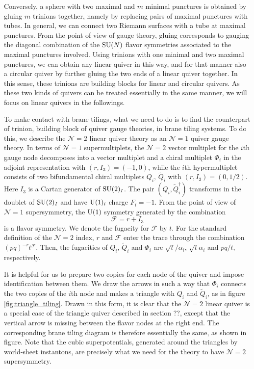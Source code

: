 Conversely, a sphere with two maximal and $m$ minimal punctures is
obtained by gluing $m$ trinions together, namely by replacing pairs
of maximal punctures with tubes. In general, we can connect two Riemann
surfaces with a tube at maximal punctures. From the point of view
of gauge theory, gluing corresponds to gauging the diagonal combination
of the $\mathrm{SU}(N)$ flavor symmetries associated to the maximal punctures
involved. Using trinions with one minimal and two maximal punctures,
we can obtain any linear quiver in this way, and for that manner also
a circular quiver by further gluing the two ends of a linear quiver
together. In this sense, these trinions are building blocks for linear
and circular quivers. As these two kinds of quivers can be treated
essentially in the same manner, we will focus on linear quivers in
the followings.

To make contact with brane tilings, what we need to do is to find
the counterpart of trinion, building block of quiver gauge theories,
in brane tiling systems. To do this, we describe the $\mathcal{N}=2$
linear quiver theory as an $\mathcal{N}=1$ quiver gauge theory. In
terms of $\mathcal{N}=1$ supermultiplets, the $\mathcal{N}=2$ vector
multiplet for the $i$th gauge node decomposes into a vector multiplet
and a chiral multiplet $\Phi_{i}$ in the adjoint representation with
$\left(r,I_{3}\right)=\left(-1,0\right)$, while the $i$th hypermultiplet
consists of two bifundamental chiral multiplets $Q_{i},\,\tilde{Q}_{i}$
with $\left(r,I_{3}\right)=\left(0,1/2\right)$. Here $I_{3}$ is
a Cartan generator of $\mathrm{SU}(2)_{I}$. The pair $(Q_{i},\tilde{Q}_{i}^{\dagger})$
transforms in the doublet of $\mathrm{SU}(2)_{I}$ and have $\mathrm{U}(1)_{i}$ charge
$F_{i}=-1$. From the point of view of $\mathcal{N}=1$ supersymmetry,
the $\mathrm{U}(1)$ symmetry generated by the combination 
\begin{equation}
    \mathcal{F}  =  r + I_{3}
\end{equation}
is a flavor symmetry. We denote the fugacity for $\mathcal{F}$ by
$t$. For the standard definition of the $\mathcal{N}=2$ index, $r$
and $\mathcal{F}$ enter the trace through the combination $(pq)^{-r}t^{\mathcal{F}}$.
Then, the fugacities of $Q_{i},\,\tilde{Q}_{i}$ and $\Phi_{i}$ are
$\sqrt{t}/\alpha_{i}$, $\sqrt{t}\alpha_{i}$ and $pq/t$, respectively. 

It is helpful for us to prepare two copies for each node of the quiver
and impose identification between them. We draw the arrows in such
a way that $\Phi_{i}$ connects the two copies of the $i$th node
and makes a triangle with $Q_{i}$ and $\tilde{Q}_{i}$, as in figure \ref{fig:triangle_tiling}.
Drawn in this form, it is clear that the $\mathcal{N}=2$ linear quiver
is a special case of the triangle quiver described in section ??,
except that the vertical arrow is missing between the flavor nodes
at the right end. The corresponding brane tiling diagram is therefore
essentially the same, as shown in figure. Note that the cubic superpotentials,
generated around the triangles by world-sheet instantons, are precisely
what we need for the theory to have $\mathcal{N}=2$ supersymmetry.


